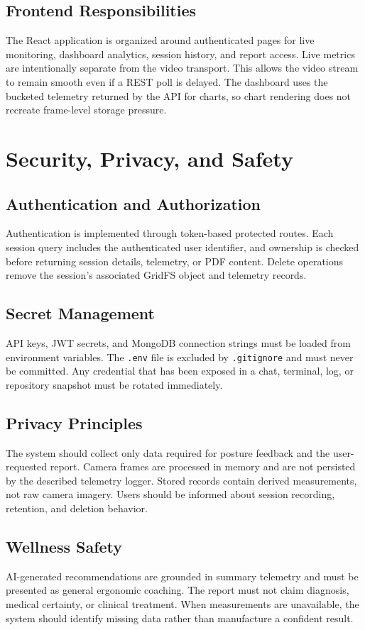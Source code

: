 \documentclass[12pt,a4paper]{report}
\newcommand{\code}[1]{\texttt{#1}}
\begin{document}
\section{Frontend Responsibilities}
The React application is organized around authenticated pages for live
monitoring, dashboard analytics, session history, and report access. Live
metrics are intentionally separate from the video transport. This allows the
video stream to remain smooth even if a REST poll is delayed. The dashboard
uses the bucketed telemetry returned by the API for charts, so chart rendering
does not recreate frame-level storage pressure.

\chapter{Security, Privacy, and Safety}
\section{Authentication and Authorization}
Authentication is implemented through token-based protected routes. Each
session query includes the authenticated user identifier, and ownership is
checked before returning session details, telemetry, or PDF content. Delete
operations remove the session's associated GridFS object and telemetry records.

\section{Secret Management}
API keys, JWT secrets, and MongoDB connection strings must be loaded from
environment variables. The \code{.env} file is excluded by \code{.gitignore}
and must never be committed. Any credential that has been exposed in a chat,
terminal, log, or repository snapshot must be rotated immediately.

\section{Privacy Principles}
The system should collect only data required for posture feedback and the
user-requested report. Camera frames are processed in memory and are not
persisted by the described telemetry logger. Stored records contain derived
measurements, not raw camera imagery. Users should be informed about session
recording, retention, and deletion behavior.

\section{Wellness Safety}
AI-generated recommendations are grounded in summary telemetry and must be
presented as general ergonomic coaching. The report must not claim diagnosis,
medical certainty, or clinical treatment. When measurements are unavailable,
the system should identify missing data rather than manufacture a confident
result.
\end{document}
